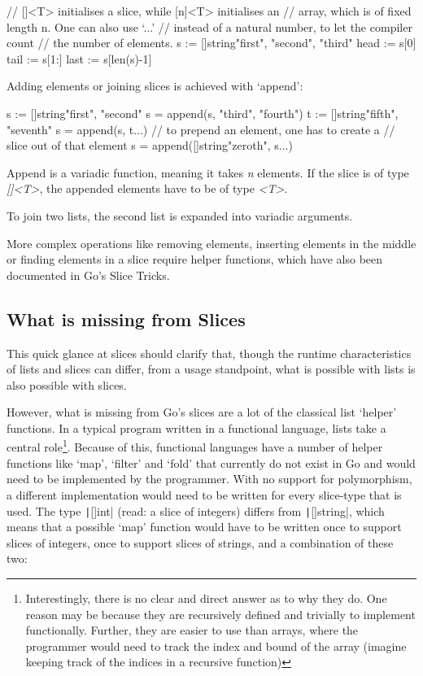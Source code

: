 \begin{gocode}
// []<T> initialises a slice, while [n]<T> initialises an
// array, which is of fixed length n. One can also use `...'
// instead of a natural number, to let the compiler count
// the number of elements.
s := []string{"first", "second", "third"}
head := s[0]
tail := s[1:]
last := s[len(s)-1]
\end{gocode}

Adding elements or joining slices is achieved with `append':

\begin{gocode}
s := []string{"first", "second"}
s = append(s, "third", "fourth")
t := []string{"fifth", "seventh"}
s = append(s, t...)
// to prepend an element, one has to create a
// slice out of that element
s = append([]string{"zeroth"}, s...)
\end{gocode}

Append is a variadic function, meaning it takes \textit{n} elements. If the slice is of type \textit{[]<T>},
the appended elements have to be of type \textit{<T>}.

To join two lists, the second list is expanded into
variadic arguments.

More complex operations like removing elements, inserting elements in the middle or finding
elements in a slice require helper functions, which have also been documented in Go's
Slice Tricks\autocite{slice-tricks}.

\subsection{What is missing from Slices}

This quick glance at slices should clarify that, though the runtime characteristics of lists and slices
can differ, from a usage standpoint, what is possible with lists is also possible with slices.

However, what is missing from Go's slices are a lot of the classical list `helper' functions.
In a typical program written in a functional language, lists take a central role\footnote{Interestingly,
	there is no clear and direct answer as to why they do. One reason may be because they are recursively
	defined and trivially to implement functionally. Further, they are easier to use than arrays, where
	the programmer would need to track the index and bound of the array (imagine keeping track of the
indices in a recursive function)\autocite{why-lists}}. Because of this, functional languages have
a number of helper functions like `map', `filter' and `fold'\autocite{haskell-list-funcs} that currently do
not exist in Go and would need to be implemented by the programmer. With no support for polymorphism, a
different implementation would need to be written for every slice-type that is used. The type \texttt|[]int|
(read: a slice of integers) differs from \texttt|[]string|, which means that a possible
`map' function would have to be written once to support slices of integers, once to support slices
of strings, and a combination of these two:

